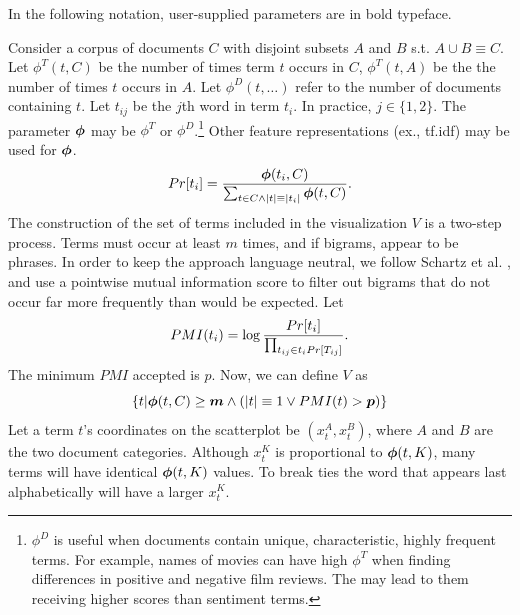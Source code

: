 \documentclass[11pt,a4paper]{article}
\begin{document}
In the following notation, user-supplied parameters are in bold typeface. 

Consider a corpus of documents $C$ with disjoint subsets $A$ and $B$ s.t. $A \cup B \equiv C$. Let $\phi^T(t,C)$ be the number of times term $t$ occurs in $C$, $\phi^{T}(t,A)$ be the the number of times $t$ occurs in $A$. Let $\phi^{D}(t,\ldots)$ refer to the number of documents containing $t$. Let $t_{ij}$ be the $j$th word in term $t_i$.  In practice, $j \in \{1,2\}$. The parameter $\mbox{\boldmath$\phi$}$ may be $\phi^T$ or $\phi^D$.\footnote{$\phi^D$ is useful when documents contain unique, characteristic, highly frequent terms.  For example, names of movies can have high $\phi^T$ when finding differences in positive and negative film reviews. The may lead to them receiving higher scores than sentiment terms.}  Other feature representations (ex., tf.idf) may be used for $\mbox{\boldmath$\phi$}$. 
\begin{equation}
\vspace{-.2cm}
Pr[t_i] = \frac{\mbox{\boldmath$\phi$}(t_i,C)}{\sum_{t \in C\wedge|t|\equiv|t_i|} \mbox{\boldmath$\phi$}(t,C)}.
\vspace{-.1cm}
\end{equation}
The construction of the set of terms included in the visualization $V$ is a two-step process. Terms must occur at least \mbox{\boldmath$m$} times, and if bigrams, appear to be phrases.  In order to keep the approach language neutral, we follow Schartz et al. , and use a pointwise mutual information score to filter out bigrams that do not occur far more frequently than would be expected.  Let
\begin{equation}
\vspace{-.2cm}
PMI(t_i) = \log \frac{Pr[t_i]}{\prod_{t_{ij}\in t_i{Pr[T_{ij}]}}}.
\end{equation}
The minimum $PMI$ accepted is \mbox{\boldmath$p$}. Now, we can define $V$ as 
\begin{equation}
\{t|\mbox{\boldmath$\phi$}(t,C)\geq\mbox{\boldmath$m$} \wedge (|t| \equiv 1 \vee PMI(t) > \mbox{\boldmath$p$})\}
\end{equation}
Let a term $t$'s coordinates on the scatterplot be $(x^{A}_{t}, x^{B}_t)$, where $A$ and $B$ are the two document categories. Although $x^{K}_t$ is proportional to $\mbox{\boldmath$\phi$}(t,K)$, many terms will have identical $\mbox{\boldmath$\phi$}(t,K)$ values.  To break ties the word that appears last alphabetically will have a larger $x^{K}_t$.
\end{document}
